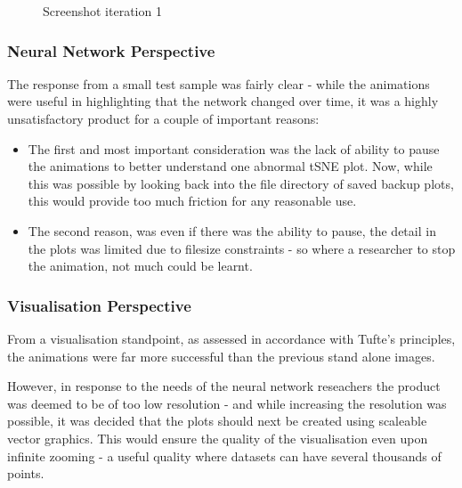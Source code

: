 \documentclass[a4paper,11pt,titlepage]{article}
\begin{document}
	\begin{figure}[H]
    			\caption{Screenshot iteration 1}%
	\end{figure}		
	
		\subsubsection{Neural Network Perspective}
		The response from a small test sample was fairly clear - while the animations were useful in highlighting that the network changed over time, it was a highly unsatisfactory product for a couple of important reasons: 
		\begin{itemize}
			\item The first and most important consideration was the lack of ability to pause the animations to better understand one abnormal tSNE plot. Now, while this was possible by looking back into the file directory of saved backup plots, this would provide too much friction for any reasonable use.
			\item The second reason, was even if there was the ability to pause, the detail in the plots was limited due to filesize constraints - so where a researcher to stop the animation, not much could be learnt.
		\end{itemize}
		
		\subsubsection{Visualisation Perspective}
		From a visualisation standpoint, as assessed in accordance with Tufte's principles, the animations were far more successful than the previous stand alone images.
		\par 
		However, in response to the needs of the neural network reseachers the product was deemed to be of too low resolution - and while increasing the resolution was possible, it was decided that the plots should next be created using scaleable vector graphics. This would ensure the quality of the visualisation even upon infinite zooming - a useful quality where datasets can have several thousands of points. 
\end{document}
